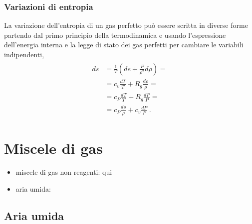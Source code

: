 \documentclass[letterpaper,10pt,italian]{jupyterBook}
\begin{document}
\subsubsection{Variazioni di entropia}
\label{\detokenize{ch/thermodynamics/ideal-gas-formulas:variazioni-di-entropia}}
\sphinxAtStartPar
La variazione dell’entropia di un gas perfetto può essere scritta in diverse forme partendo dal primo principio della termodinamica e usando l’espressione dell’energia interna e la legge di stato dei gas perfetti per cambiare le variabili indipendenti,
\begin{equation*}
\begin{split}\begin{aligned}
  ds & = \frac{1}{T} \left( d e + \frac{P}{\rho^2} d \rho \right) = \\
     & = c_v \frac{dT}{T} + R_g \frac{d \rho}{\rho} = \\
     & = c_P \frac{dT}{T} + R_g \frac{d P}{P} = \\
     & = c_P \frac{d \rho}{\rho} + c_v \frac{d P}{P}  \ .
\end{aligned}\end{split}
\end{equation*}
\sphinxstepscope


\section{Miscele di gas}
\label{\detokenize{ch/thermodynamics/gas-mixture:miscele-di-gas}}\label{\detokenize{ch/thermodynamics/gas-mixture:physics-hs-thermodynamics-matter-gases-mixture}}\label{\detokenize{ch/thermodynamics/gas-mixture::doc}}\begin{itemize}
\item {} 
\sphinxAtStartPar
miscele di gas non reagenti: qui

\item {} 
\sphinxAtStartPar
aria umida: 

\end{itemize}

\sphinxstepscope


\subsection{Aria umida}
\label{\detokenize{ch/thermodynamics/humid-air:aria-umida}}\label{\detokenize{ch/thermodynamics/humid-air:physics-hs-thermodynamics-matter-humid-air}}\label{\detokenize{ch/thermodynamics/humid-air::doc}}
\end{document}
